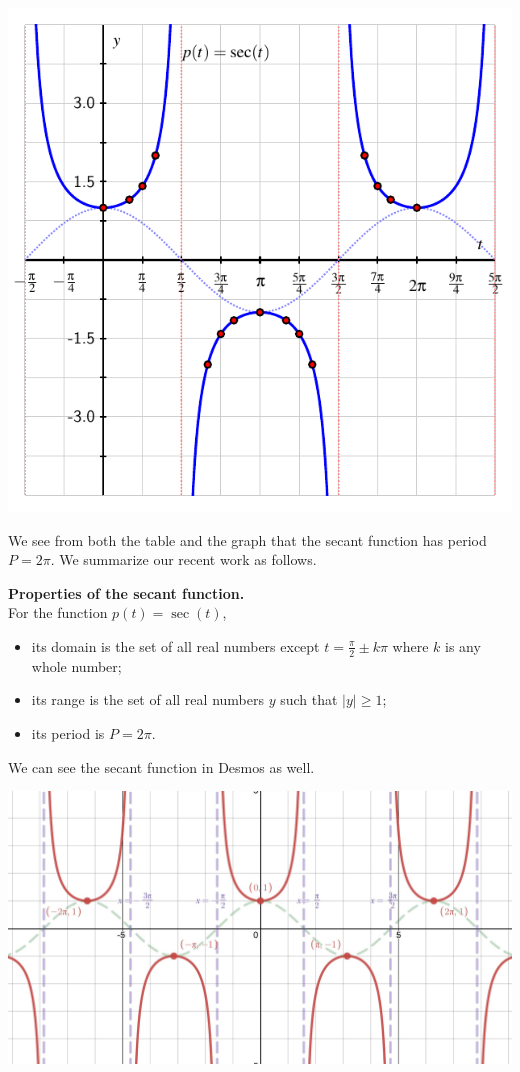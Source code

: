 \documentclass[nooutcomes, noauthor]{ximera}
\begin{document}
\begin{image}
\includegraphics{other-sec-definition-graph.pdf}
\end{image}

We see from both the table and the graph that the secant function has period \(P = 2\pi\).  We summarize our recent work as follows.

\begin{callout}
\textbf{Properties of the secant function.}\\
For the function \(p(t) = \sec(t)\),
\begin{itemize}[label=\textbullet]
\item
its domain is the set of all real numbers except \(t = \frac{\pi}{2} \pm k\pi\) where \(k\) is any whole number;%
\item
its range is the set of all real numbers \(y\) such that \(|y| \ge 1\);%
\item
its period is \(P = 2\pi\).%
\end{itemize}
\end{callout}

We can see the secant function in Desmos as well.  

\begin{image}
\includegraphics[width=\textwidth]{secant.jpg}
\end{image}
\end{document}
